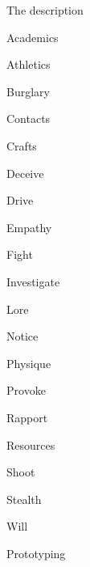 \begin{npcBox}[title=Indiana a Lost looter]
    \begin{consequences}
    \item {}
    \item {}
    \item {}
    \end{consequences}
    
    \begin{npcDescription}
    The description
    \end{npcDescription}
    
\end{npcBox}



\begin{npcBox}[title=Static a Pioneer Bionics architect]

    \begin{aspects}
    \item {}
    \item {}
    \item {}
    \end{aspects}
    
    \begin{skills}
        \item {} Academics
        \item {} Athletics
        \item {} Burglary
        \item {} Contacts
        \item {} Crafts
        \item {} Deceive
        \item {} Drive
        \item {} Empathy
        \item {} Fight
        \item {} Investigate
        \item {} Lore
        \item {} Notice
        \item {} Physique
        \item {} Provoke
        \item {} Rapport
        \item {} Resources
        \item {} Shoot
        \item {} Stealth
        \item {} Will
        \item {} Prototyping
     \end{skills}
    

\end{npcBox}
